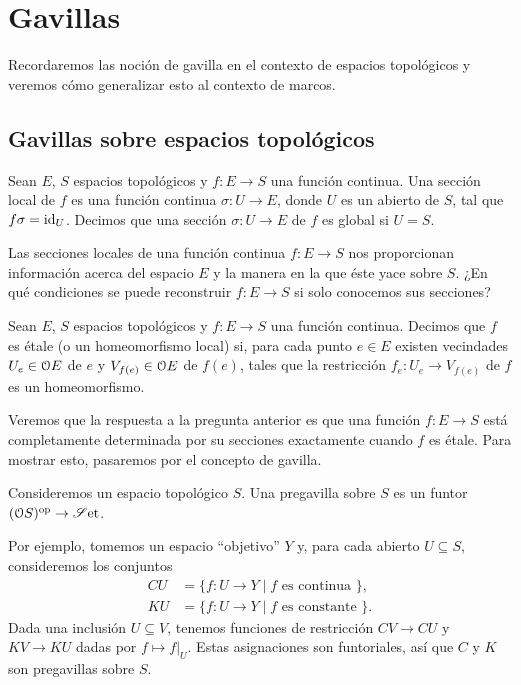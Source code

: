 \chapter{Gavillas}

Recordaremos las noción de gavilla en el contexto
de espacios topológicos y veremos cómo generalizar esto
al contexto de marcos.

\section{Gavillas sobre espacios topológicos}

\begin{definition}
    Sean $E$, $S$ espacios topológicos
    y $f:E\to S$ una función continua.
    Una sección local de $f$ es una función continua $\sigma:U\to E$,
    donde $U$ es un abierto de $S$, tal que $f\sigma=\id_U$.
    Decimos que una sección $\sigma:U\to E$ de $f$ es global si $U=S$.
\end{definition}

Las secciones locales de una función continua $f:E\to S$
nos proporcionan información acerca del espacio $E$
y la manera en la que éste yace sobre $S$.
¿En qué condiciones se puede reconstruir $f:E\to S$ si solo
conocemos sus secciones?

\begin{definition}
    Sean $E$, $S$ espacios topológicos
    y $f:E\to S$ una función continua.
    Decimos que $f$ es étale (o un homeomorfismo local) si,
    para cada punto $e\in E$ existen vecindades
    $U_e\in\cal OE$ de $e$ y $V_{f(e)}\in\cal OE$ de $f(e)$,
    tales que la restricción
    $f_e:U_e\to V_{f(e)}$ de $f$ es un homeomorfismo.
\end{definition}

Veremos que la respuesta a la pregunta anterior
es que una función $f:E\to S$ está completamente determinada
por su secciones exactamente cuando $f$ es étale.
Para mostrar esto, pasaremos por el concepto de gavilla.

\begin{definition}
    Consideremos un espacio topológico $S$.
    Una pregavilla sobre $S$ es un funtor $(\cal OS)^\op\to\Con$.
\end{definition}

Por ejemplo, tomemos un espacio ``objetivo'' $Y$ y,
para cada abierto $U\subseteq S$,
consideremos los conjuntos
\begin{align*}
    CU &= \{f:U\to Y\mid f \text{ es continua }\}, \\
    KU &= \{f:U\to Y\mid f \text{ es constante }\}.
\end{align*}
Dada una inclusión $U\subseteq V$,
tenemos funciones de restricción $CV\to CU$ y $KV\to KU$
dadas por $f\mapsto f|_U$.
Estas asignaciones son funtoriales,
así que $C$ y $K$ son pregavillas sobre $S$.

